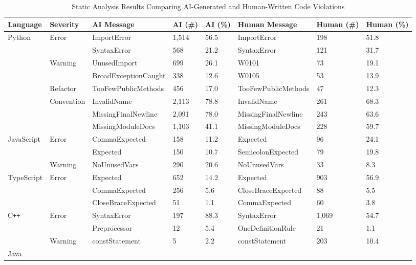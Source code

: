 \begin{table}[t!]
\centering
\caption{Static Analysis Results Comparing AI-Generated and Human-Written Code Violations}
\label{tab:static_analysis_ai_vs_human}
\small
\begin{tabularx}{\textwidth}{@{}lllXXlXX@{}}
\toprule
\textbf{Language} & \textbf{Severity} & \textbf{AI Message} & \textbf{AI (\#)} & \textbf{AI (\%)} & \textbf{Human Message} & \textbf{Human (\#)} & \textbf{Human (\%)} \\
\midrule
\multirow{8}{*}{Python}
& \multirow{2}{*}{Error}
  & ImportError & 1,514 & 56.5 & ImportError & 198 & 51.8 \\
& & SyntaxError & 568 & 21.2 & SyntaxError & 121 & 31.7 \\
& \multirow{2}{*}{Warning}
  & UnusedImport & 699 & 26.1 & W0101 & 73 & 19.1 \\
& & BroadExceptionCaught & 338 & 12.6 & W0105 & 53 & 13.9 \\
& Refactor
  & TooFewPublicMethods & 456 & 17.0 & TooFewPublicMethods & 47 & 12.3 \\
& \multirow{3}{*}{Convention}
  & InvalidName & 2,113 & 78.8 & InvalidName & 261 & 68.3 \\
& & MissingFinalNewline & 2,091 & 78.0 & MissingFinalNewline & 243 & 63.6 \\
& & MissingModuleDocs & 1,103 & 41.1 & MissingModuleDocs & 228 & 59.7 \\
\midrule
\multirow{3}{*}{JavaScript}
& \multirow{2}{*}{Error}
  & CommaExpected & 158 & 11.2 & Expected & 96 & 24.1 \\
& & Expected & 150 & 10.7 & SemicolonExpected & 79 & 19.8 \\
& Warning
  & NoUnusedVars & 290 & 20.6 & NoUnusedVars & 33 & 8.3 \\
\midrule
\multirow{3}{*}{TypeScript}
& \multirow{3}{*}{Error}
  & Expected & 652 & 14.2 & Expected & 903 & 56.9 \\
& & CommaExpected & 256 & 5.6 & CloseBraceExpected & 88 & 5.5 \\
& & CloseBraceExpected & 51 & 1.1 & CommaExpected & 60 & 3.8 \\
\midrule
\multirow{3}{*}{C\texttt{++}}
& \multirow{2}{*}{Error}
  & SyntaxError & 197 & 88.3 & SyntaxError & 1,069 & 54.7 \\
& & Preprocessor & 12 & 5.4 & OneDefinitionRule & 21 & 1.1 \\
& Warning
  & constStatement & 5 & 2.2 & constStatement & 203 & 10.4 \\
\midrule
\multirow{4}{*}{Java}

\end{tabularx}
\end{table}
